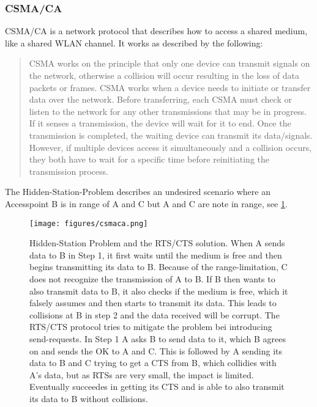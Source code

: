       \subsubsection{\ac{CSMA/CA}}
	\ac{CSMA/CA} is a network protocol that describes how to access a shared medium, like a shared WLAN channel.
	It works as described by the following:
	\begin{quotation}
	  CSMA works on the principle that only one device can transmit signals on the network, 
	  otherwise a collision will occur resulting in the loss of data packets or frames. 
	  CSMA works when a device needs to initiate or transfer data over the network. 
	  Before transferring, each CSMA must check or listen to the network for any other transmissions that may be in progress. 
	  If it senses a transmission, the device will wait for it to end. Once the transmission is completed, 
	  the waiting device can transmit its data/signals. However, if multiple devices access it simultaneously and a collision occurs, 
	  they both have to wait for a specific time before reinitiating the transmission process. 
	\end{quotation} \cite{csma_techo}
	
	The Hidden-Station-Problem describes an undesired scenario where an Accesspoint B is in range of A and C but A and C are note in range, see \ref{fig:csmaca}.
	
	\begin{figure}[t]
	  \centering
	  \texttt{[image: figures/csmaca.png]}
	  \caption{Hidden-Station Problem and the RTS/CTS solution. When A sends data to B in Step 1, 
	    it first waits until the medium is free and then begins transmitting its data to B. 
	    Because of the range-limitation, C does not recognize the transmission of A to B. 
	    If B then wants to also transmit data to B, it also checks if the medium is free, which it falsely assumes
	    and then starts to transmit its data. This leads to collisions at B in step 2 and the data received will be corrupt.
	    The RTS/CTS protocol tries to mitigate the problem bei introducing send-requests. In Step 1 A asks B to send data to it, which B agrees on and sends the OK to
	    A and C. This is followed by A sending its data to B and C trying to get a CTS from B, which collidies with A's data, but as RTSs are very small, the impact
	    is limited. Eventually succeedes in getting its CTS and is able to also transmit its data to B without collisions.}
	  \label{fig:csmaca}
	\end{figure}

